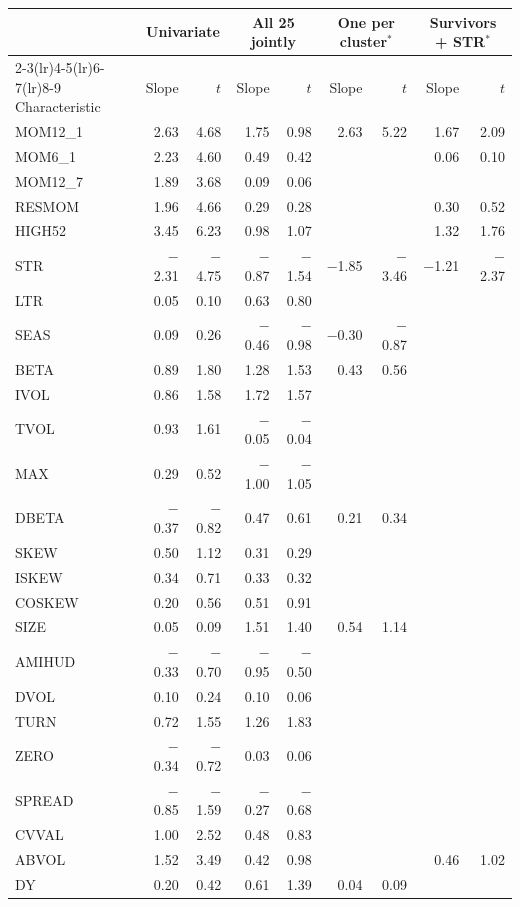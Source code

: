 \begin{tabular}{l rr rr rr rr}
\toprule
 & \multicolumn{2}{c}{Univariate} & \multicolumn{2}{c}{All 25 jointly} & \multicolumn{2}{c}{One per cluster$^\ast$} & \multicolumn{2}{c}{Survivors + STR$^\ast$} \\
\cmidrule(lr){2-3}\cmidrule(lr){4-5}\cmidrule(lr){6-7}\cmidrule(lr){8-9}
Characteristic & Slope & $t$ & Slope & $t$ & Slope & $t$ & Slope & $t$ \\
\midrule
MOM12\_1 & 2.63 & 4.68 & 1.75 & 0.98 & 2.63 & 5.22 & 1.67 & 2.09 \\
MOM6\_1 & 2.23 & 4.60 & 0.49 & 0.42 &  &  & 0.06 & 0.10 \\
MOM12\_7 & 1.89 & 3.68 & 0.09 & 0.06 &  &  &  &  \\
RESMOM & 1.96 & 4.66 & 0.29 & 0.28 &  &  & 0.30 & 0.52 \\
HIGH52 & 3.45 & 6.23 & 0.98 & 1.07 &  &  & 1.32 & 1.76 \\
\addlinespace[2pt]
STR & $-$2.31 & $-$4.75 & $-$0.87 & $-$1.54 & $-$1.85 & $-$3.46 & $-$1.21 & $-$2.37 \\
LTR & 0.05 & 0.10 & 0.63 & 0.80 &  &  &  &  \\
\addlinespace[2pt]
SEAS & 0.09 & 0.26 & $-$0.46 & $-$0.98 & $-$0.30 & $-$0.87 &  &  \\
\addlinespace[2pt]
BETA & 0.89 & 1.80 & 1.28 & 1.53 & 0.43 & 0.56 &  &  \\
IVOL & 0.86 & 1.58 & 1.72 & 1.57 &  &  &  &  \\
TVOL & 0.93 & 1.61 & $-$0.05 & $-$0.04 &  &  &  &  \\
MAX & 0.29 & 0.52 & $-$1.00 & $-$1.05 &  &  &  &  \\
\addlinespace[2pt]
DBETA & $-$0.37 & $-$0.82 & 0.47 & 0.61 & 0.21 & 0.34 &  &  \\
SKEW & 0.50 & 1.12 & 0.31 & 0.29 &  &  &  &  \\
ISKEW & 0.34 & 0.71 & 0.33 & 0.32 &  &  &  &  \\
COSKEW & 0.20 & 0.56 & 0.51 & 0.91 &  &  &  &  \\
\addlinespace[2pt]
SIZE & 0.05 & 0.09 & 1.51 & 1.40 & 0.54 & 1.14 &  &  \\
AMIHUD & $-$0.33 & $-$0.70 & $-$0.95 & $-$0.50 &  &  &  &  \\
DVOL & 0.10 & 0.24 & 0.10 & 0.06 &  &  &  &  \\
TURN & 0.72 & 1.55 & 1.26 & 1.83 &  &  &  &  \\
ZERO & $-$0.34 & $-$0.72 & 0.03 & 0.06 &  &  &  &  \\
SPREAD & $-$0.85 & $-$1.59 & $-$0.27 & $-$0.68 &  &  &  &  \\
CVVAL & 1.00 & 2.52 & 0.48 & 0.83 &  &  &  &  \\
ABVOL & 1.52 & 3.49 & 0.42 & 0.98 &  &  & 0.46 & 1.02 \\
\addlinespace[2pt]
DY & 0.20 & 0.42 & 0.61 & 1.39 & 0.04 & 0.09 &  &  \\
\bottomrule
\end{tabular}
